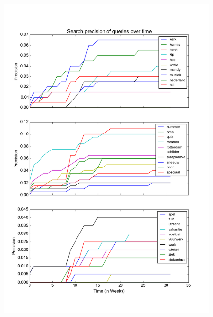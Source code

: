 \begin{figure}[H]
\centering
\includegraphics[width=\textwidth]{appendixb/precisionovertime20}
\end{figure}